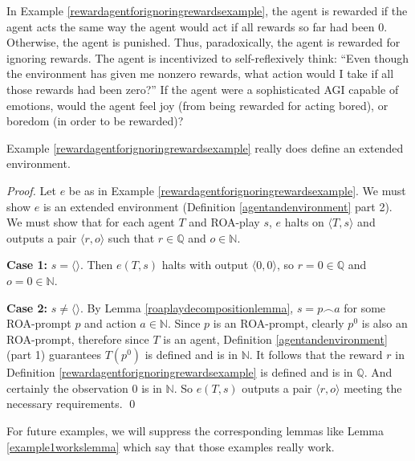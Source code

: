 \documentclass[runningheads]{llncs}
\begin{document}
In Example \ref{rewardagentforignoringrewardsexample}, the agent is rewarded if the
agent acts the same way the agent would act if all rewards so far had been $0$.
Otherwise, the agent is punished. Thus, paradoxically, the agent is rewarded for
ignoring rewards. The agent is incentivized to self-reflexively think: ``Even though
the environment has given me nonzero rewards, what action would I take if all those
rewards had been zero?'' If the agent were a sophisticated AGI capable of emotions,
would the agent feel joy (from being rewarded for acting bored), or boredom (in order
to be rewarded)?

\begin{lemma}
\label{example1workslemma}
    Example \ref{rewardagentforignoringrewardsexample} really does define an
    extended environment.
\end{lemma}

\begin{proof}
    Let $e$ be as in
    Example \ref{rewardagentforignoringrewardsexample}.
    We must show $e$ is an extended environment (Definition \ref{agentandenvironment}
    part 2). We must show that for each agent $T$ and ROA-play $s$,
    $e$ halts on $\langle T,s\rangle$ and outputs a pair $\langle r,o\rangle$
    such that $r\in\mathbb Q$ and $o\in\mathbb N$.

    \textbf{Case 1:} $s=\langle\rangle$. Then $e(T,s)$ halts with output
    $\langle 0,0\rangle$, so $r=0\in\mathbb Q$ and $o=0\in\mathbb N$.

    \textbf{Case 2:} $s\not=\langle\rangle$. By Lemma \ref{roaplaydecompositionlemma},
    $s=p\frown a$ for some ROA-prompt $p$ and action $a\in\mathbb N$.
    Since $p$ is an ROA-prompt, clearly $p^0$ is also an ROA-prompt, therefore
    since $T$ is an agent, Definition \ref{agentandenvironment} (part 1)
    guarantees $T(p^0)$ is defined and is in $\mathbb N$. It follows that the reward
    $r$ in Definition \ref{rewardagentforignoringrewardsexample} is defined and is in
    $\mathbb Q$. And certainly the observation $0$ is in $\mathbb N$.
    So $e(T,s)$ outputs a pair $\langle r,o\rangle$ meeting the necessary
    requirements.
    \qed
\end{proof}

For future examples, we will suppress the corresponding lemmas like
Lemma \ref{example1workslemma} which say that those examples really work.
\end{document}
